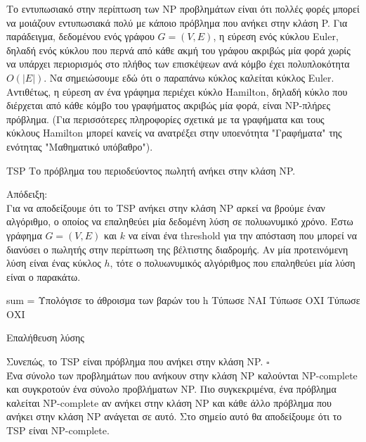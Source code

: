 \documentclass[oneside,12pt]{book}
\theoremstyle{definition}
\begin{document}
Το εντυπωσιακό στην περίπτωση των NP προβλημάτων είναι ότι πολλές φορές μπορεί να μοιάζουν εντυπωσιακά πολύ με κάποιο πρόβλημα που ανήκει στην κλάση P. Για παράδειγμα, δεδομένου ενός γράφου \(G = (V,E)\), η εύρεση ενός κύκλου Euler, δηλαδή ενός κύκλου που περνά από κάθε ακμή του γράφου ακριβώς μία φορά χωρίς να υπάρχει περιορισμός στο πλήθος των επισκέψεων ανά κόμβο έχει πολυπλοκότητα \(Ο(|Ε|)\). Να σημειώσουμε εδώ ότι ο παραπάνω κύκλος καλείται κύκλος Euler. Αντιθέτως, η εύρεση αν ένα γράφημα περιέχει κύκλο Hamilton, δηλαδή κύκλο που διέρχεται από κάθε κόμβο του γραφήματος ακριβώς μία φορά, είναι NP-πλήρες πρόβλημα. (Για περισσότερες πληροφορίες σχετικά με τα γραφήματα και τους κύκλους Hamilton μπορεί κανείς να ανατρέξει στην υποενότητα "Γραφήματα" της ενότητας "Μαθηματικό υπόβαθρο"). \\ 

\begin{mylemma}{TSP}{}
	Tο πρόβλημα του περιοδεύοντος πωλητή ανήκει στην κλάση NP.	
\end{mylemma}
 
Απόδειξη: \\
Για να αποδείξουμε ότι το TSP ανήκει στην κλάση NP αρκεί να βρούμε έναν αλγόριθμο, ο οποίος να επαληθεύει μία δεδομένη λύση σε πολυωνυμικό χρόνο. Έστω γράφημα \(G = (V,E)\) και \(k\) να είναι ένα threshold για την απόσταση που μπορεί να διανύσει ο πωλητής στην περίπτωση της βέλτιστης διαδρομής. Αν μία προτεινόμενη λύση είναι ένας κύκλος \(h\), τότε ο πολυωνυμικός αλγόριθμος που επαληθεύει μία λύση είναι ο παρακάτω. 

\begin{algorithm}[H]
	\SetAlgoLined
	
	{
		sum = Υπολόγισε το άθροισμα των βαρών του h \;
		{
			Τύπωσε ΝΑΙ \;
		}
		\Else
		{
			Τύπωσε ΟΧΙ \;}
		}
	\Else
	{
		Τύπωσε ΟΧΙ \;
	}
	
	\caption{Επαλήθευση λύσης}
\end{algorithm}

Συνεπώς, το TSP είναι πρόβλημα που ανήκει στην κλάση NP. \(\square\) \\

Ένα σύνολο των προβλημάτων που ανήκουν στην κλάση NP καλούνται NP-complete και συγκροτούν ένα σύνολο προβλήματων NP. Πιο συγκεκριμένα, ένα πρόβλημα καλείται NP-complete αν ανήκει στην κλάση NP και κάθε άλλο πρόβλημα που ανήκει στην κλάση NP ανάγεται σε αυτό. Στο σημείο αυτό θα αποδείξουμε ότι το TSP είναι NP-complete. \\
\end{document}
